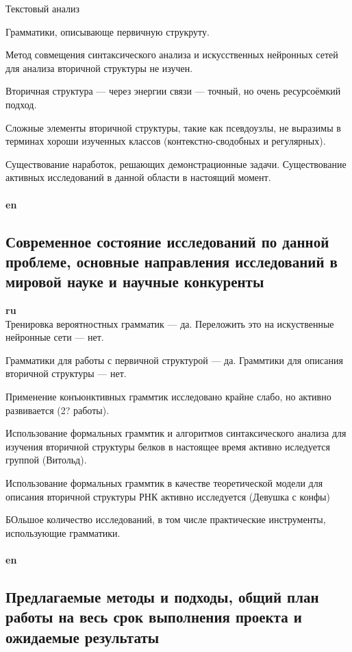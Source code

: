 \documentclass[12pt]{article}  %
\theoremstyle{remark}
\begin{document}
Текстовый анализ

Грамматики, описывающе первичную струкруту.

Метод совмещения синтаксического анализа и искусственных нейронных сетей для анализа вторичной структуры не изучен.

Вторичная структура --- через энергии связи --- точный, но очень ресурсоёмкий подход.

Сложные элементы вторичной структуры, такие как псевдоузлы, не выразимы в терминах хороши изученных классов (контекстно-сводобных и регулярных).

Существование наработок, решающих демонстрационные задачи.
Существование активных исследований в данной области в настоящий момент.
\\
\\
\textbf{en}\\


\subsection{Современное состояние исследований по данной проблеме, основные направления исследований в мировой науке и научные конкуренты}

\textbf{ru}\\
Тренировка вероятностных грамматик --- да.
Переложить это на искуственные нейронные сети --- нет.

Грамматики для работы с первичной структурой --- да.
Граммтики для описания вторичной структуры --- нет.

Применение конъюнктивных граммтик исследовано крайне слабо, но активно развивается (2? работы).

Использование формальных граммтик и алгоритмов синтаксического анализа для изучения вторичной структуры белков в настоящее время активно иследуется группой (Витольд).

Использование формальных граммтик в качестве теоретической модели для описания вторичной структуры РНК активно исследуется (Девушка с конфы)

БОльшое количество исследований, в том числе практические инструменты, использующие грамматики.
\\
\\
\textbf{en}\\



\subsection{Предлагаемые методы и подходы, общий план работы на весь срок выполнения проекта и ожидаемые результаты }
\end{document}
